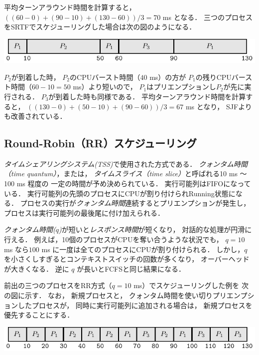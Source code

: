 平均ターンアラウンド時間を計算すると，
$((60-0)+(90-10)+(130-60))/3=70$ ms となる．
三つのプロセスをSRTFでスケジューリングした場合は次の図のようになる．

\begin{center}
  \includegraphics[scale=1.0]{GanntChart/srtf1.pdf}
\end{center}

$P_2$が到着した時，
$P_2$のCPUバースト時間（$40$ ms）の方が
$P_1$の残りCPUバースト時間（$60 - 10 = 50$ ms）より短いので，
$P_1$はプリエンプションし$P_2$が先に実行される．
$P_3$が到着した時も同様である．
平均ターンアラウンド時間を計算すると，
$((130-0)+(50-10)+(90-60))/3=67$ ms となり，
SJFよりも改善されている．

\subsection{Round-Robin（RR）スケジューリング}
\emph{タイムシェアリングシステム(TSS)}で使用された方式である．
\emph{クォンタム時間（time quantum）}，または，
\emph{タイムスライス（time slice）}と呼ばれる10 ms 〜 100 ms 程度の
一定の時間が予め決められている．
実行可能列はFIFOになっている．
実行可能列の先頭のプロセスにCPUが割り付けられRunning状態になる．
プロセスの実行が\emph{クォンタム時間}連続するとプリエンプションが発生し，
プロセスは実行可能列の最後尾に付け加えられる．

\emph{クォンタム時間($q$)}が短いと\emph{レスポンス時間}が短くなり，
対話的な処理が円滑に行える．
例えば，10個のプロセスがCPUを奪い合うような状況でも，
$q = 10$ ms なら$100$ ms に一度は全てのプロセスにCPUが割り付けられる．
しかし，$q$ を小さくしすぎるとコンテキストスイッチの回数が多くなり，
オーバーヘッドが大きくなる．
逆に $q$ が長いとFCFSと同じ結果になる．

前出の三つのプロセスをRR方式（$q = 10$ ms）でスケジューリングした例を
次の図に示す．
なお，
新規プロセスと，
クォンタム時間を使い切りプリエンプションしたプロセスが，
同時に実行可能列に追加される場合は，
新規プロセスを優先することにする．

\begin{center}
  \includegraphics[scale=1.0]{GanntChart/rr1.pdf}
\end{center}

